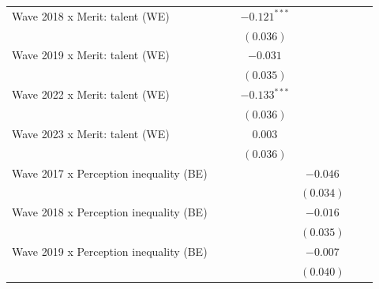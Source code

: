 \documentclass[
  12pt,
]{article}
\begin{document}
\begin{table}
{\begin{center}
{\begin{tabular}{l c c c c c c}
Wave 2018 x Merit: talent (WE)                     &               &               & $-0.121^{***}$ &              &               &               \\
                                                   &               &               & $(0.036)$      &              &               &               \\
Wave 2019 x Merit: talent (WE)                     &               &               & $-0.031$       &              &               &               \\
                                                   &               &               & $(0.035)$      &              &               &               \\
Wave 2022 x Merit: talent (WE)                     &               &               & $-0.133^{***}$ &              &               &               \\
                                                   &               &               & $(0.036)$      &              &               &               \\
Wave 2023 x Merit: talent (WE)                     &               &               & $0.003$        &              &               &               \\
                                                   &               &               & $(0.036)$      &              &               &               \\
Wave 2017 x Perception inequality (BE)             &               &               &                & $-0.046$     &               &               \\
                                                   &               &               &                & $(0.034)$    &               &               \\
Wave 2018 x Perception inequality (BE)             &               &               &                & $-0.016$     &               &               \\
                                                   &               &               &                & $(0.035)$    &               &               \\
Wave 2019 x Perception inequality (BE)             &               &               &                & $-0.007$     &               &               \\
                                                   &               &               &                & $(0.040)$    &               &               \\

\end{tabular}}
\end{center}}
\end{table}
\end{document}
